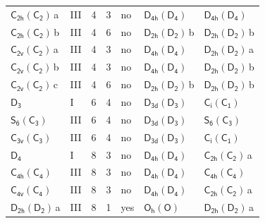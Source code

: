 \documentclass[10pt,a4paper]{article}
\numberwithin{equation}{section}
\newcommand{\grp}[1]{\mathsf{#1}}
\newcommand{\clsletter}[1]{\,{\scriptsize\color{black!55}#1}}
\begin{document}
{\begin{longtable}{@{}llrrlll@{}}
\href{C2h-C2.pdf}{$\grp{C_{2h}}(\grp{C_{2}})$}\clsletter{a} & III & 4 & 3 & no & \href{D4h-D4.pdf}{$\grp{D_{4h}}(\grp{D_{4}})$} & \href{D4h-D4.pdf}{$\grp{D_{4h}}(\grp{D_{4}})$}\\
\href{C2h-C2.pdf}{$\grp{C_{2h}}(\grp{C_{2}})$}\clsletter{b} & III & 4 & 6 & no & \href{D2h-D2.pdf}{$\grp{D_{2h}}(\grp{D_{2}})$}\clsletter{b} & \href{D2h-D2.pdf}{$\grp{D_{2h}}(\grp{D_{2}})$}\clsletter{b}\\
\href{C2v-C2.pdf}{$\grp{C_{2v}}(\grp{C_{2}})$}\clsletter{a} & III & 4 & 3 & no & \href{D4h-D4.pdf}{$\grp{D_{4h}}(\grp{D_{4}})$} & \href{D2h-D2.pdf}{$\grp{D_{2h}}(\grp{D_{2}})$}\clsletter{a}\\
\href{C2v-C2.pdf}{$\grp{C_{2v}}(\grp{C_{2}})$}\clsletter{b} & III & 4 & 3 & no & \href{D4h-D4.pdf}{$\grp{D_{4h}}(\grp{D_{4}})$} & \href{D2h-D2.pdf}{$\grp{D_{2h}}(\grp{D_{2}})$}\clsletter{b}\\
\href{C2v-C2.pdf}{$\grp{C_{2v}}(\grp{C_{2}})$}\clsletter{c} & III & 4 & 6 & no & \href{D2h-D2.pdf}{$\grp{D_{2h}}(\grp{D_{2}})$}\clsletter{b} & \href{D2h-D2.pdf}{$\grp{D_{2h}}(\grp{D_{2}})$}\clsletter{b}\\
\href{../../../rotation/data/pdf/D3.pdf}{$\grp{D_{3}}$} & I & 6 & 4 & no & \href{D3d-D3.pdf}{$\grp{D_{3d}}(\grp{D_{3}})$} & \href{S2-C1.pdf}{$\grp{C_{i}}(\grp{C_{1}})$}\\
\href{S6-C3.pdf}{$\grp{S_{6}}(\grp{C_{3}})$} & III & 6 & 4 & no & \href{D3d-D3.pdf}{$\grp{D_{3d}}(\grp{D_{3}})$} & \href{S6-C3.pdf}{$\grp{S_{6}}(\grp{C_{3}})$}\\
\href{C3v-C3.pdf}{$\grp{C_{3v}}(\grp{C_{3}})$} & III & 6 & 4 & no & \href{D3d-D3.pdf}{$\grp{D_{3d}}(\grp{D_{3}})$} & \href{S2-C1.pdf}{$\grp{C_{i}}(\grp{C_{1}})$}\\
\href{../../../rotation/data/pdf/D4.pdf}{$\grp{D_{4}}$} & I & 8 & 3 & no & \href{D4h-D4.pdf}{$\grp{D_{4h}}(\grp{D_{4}})$} & \href{C2h-C2.pdf}{$\grp{C_{2h}}(\grp{C_{2}})$}\clsletter{a}\\
\href{C4h-C4.pdf}{$\grp{C_{4h}}(\grp{C_{4}})$} & III & 8 & 3 & no & \href{D4h-D4.pdf}{$\grp{D_{4h}}(\grp{D_{4}})$} & \href{C4h-C4.pdf}{$\grp{C_{4h}}(\grp{C_{4}})$}\\
\href{C4v-C4.pdf}{$\grp{C_{4v}}(\grp{C_{4}})$} & III & 8 & 3 & no & \href{D4h-D4.pdf}{$\grp{D_{4h}}(\grp{D_{4}})$} & \href{C2h-C2.pdf}{$\grp{C_{2h}}(\grp{C_{2}})$}\clsletter{a}\\
\href{D2h-D2.pdf}{$\grp{D_{2h}}(\grp{D_{2}})$}\clsletter{a} & III & 8 & 1 & yes & \href{Oh-O.pdf}{$\grp{O_{h}}(\grp{O})$} & \href{D2h-D2.pdf}{$\grp{D_{2h}}(\grp{D_{2}})$}\clsletter{a}\\

\end{longtable}}
\end{document}
